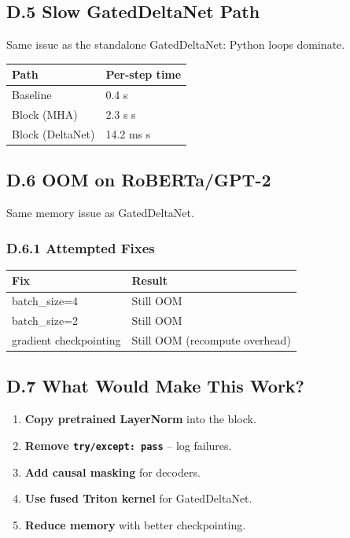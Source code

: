 \subsection{D.5 Slow GatedDeltaNet Path}

Same issue as the standalone GatedDeltaNet: Python loops dominate.

\begin{table}[H]
\centering
\small
\begin{tabular}{ll}
\toprule
\textbf{Path} & \textbf{Per-step time} \\
\midrule
Baseline & 0.4 s \\
Block (MHA) & 2.3 s s \\
Block (DeltaNet) & 14.2 ms s \\
\bottomrule
\end{tabular}
\end{table}

\subsection{D.6 OOM on RoBERTa/GPT-2}

Same memory issue as GatedDeltaNet.

\subsubsection{D.6.1 Attempted Fixes}

\begin{table}[H]
\centering
\small
\begin{tabular}{ll}
\toprule
\textbf{Fix} & \textbf{Result} \\
\midrule
batch\_size=4 & Still OOM \\
batch\_size=2 & Still OOM \\
gradient checkpointing & Still OOM (recompute overhead) \\
\bottomrule
\end{tabular}
\end{table}

\subsection{D.7 What Would Make This Work?}

\begin{enumerate}
\item \textbf{Copy pretrained LayerNorm} into the block.
\item \textbf{Remove \texttt{try/except: pass}} -- log failures.
\item \textbf{Add causal masking} for decoders.
\item \textbf{Use fused Triton kernel} for GatedDeltaNet.
\item \textbf{Reduce memory} with better checkpointing.

\end{enumerate}
